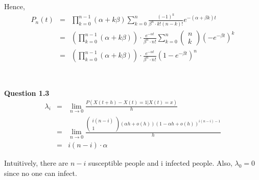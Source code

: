 \documentclass[10pt,a4paper]{article}
\begin{document}
\begin{flushleft}
Hence,
\begin{eqnarray*}
P_n(t) &=&\prod_{k=0}^{n-1} (\alpha+k\beta) \sum_{k=0}^n
\frac{(-1)^k}{\beta^n \cdot k!(n-k)!} e^{-(\alpha+\beta k )t}\\
&=&(\prod_{k=0}^{n-1} (\alpha+k\beta)) \cdot \frac{e^{- \alpha t
}}{\beta^n \cdot n!} \sum_{k=0}^n \left ( \begin{array}{c}
 n\\
 k \end{array} \right ) (-e^{-\beta t} )^k \\
 &=&(\prod_{k=0}^{n-1} (\alpha+k\beta)) \cdot \frac{e^{- \alpha t
}}{\beta^n \cdot n!} (1-e^{-\beta t} )^n \\
\end{eqnarray*}

\begin{eqnarray*}
\\
\end{eqnarray*}


\textbf{Question 1.3}\\

\begin{eqnarray*}
\lambda_i &=&\lim_{n\rightarrow0} \frac{P(X(t+h)-X(t)=1|X(t)=x)}{h}\\
&=&\lim_{n\rightarrow0} \frac{ \left ( \begin{array}{c}
 i(n-i)\\
 1 \end{array} \right ) (\alpha h +o(h))(1-\alpha h + o(h))^{i(n-i)-1}
}{h}\\
&=&  i (n-i) \cdot \alpha
\end{eqnarray*}

Intuitively, there are $n-i$ susceptible people and i infected
people. Also, $\lambda_0=0$ since no one can infect.


\begin{eqnarray*}
\\
\end{eqnarray*}




\end{flushleft}
\end{document}
